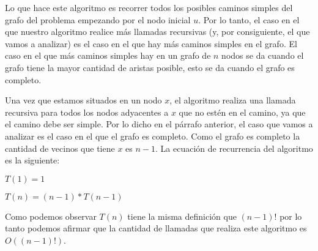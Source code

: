 Lo que hace este algoritmo es recorrer todos los posibles caminos simples del grafo del problema empezando por el nodo inicial $u$. Por lo tanto, el caso en el que nuestro algoritmo realice más llamadas recursivas (y, por consiguiente, el que vamos a analizar) es el caso en el que hay más caminos simples en el grafo. El caso en el que más caminos simples hay en un grafo de $n$ nodos se da cuando el grafo tiene la mayor cantidad de aristas posible, esto se da cuando el grafo es completo. 

Una vez que estamos situados en un nodo $x$, el algoritmo realiza una llamada recursiva para todos los nodos adyacentes a $x$ que no estén en el camino, ya que el camino debe ser simple. Por lo dicho en el párrafo anterior, el caso que vamos a analizar es el caso en el que el grafo es completo. Como el grafo es completo la cantidad de vecinos que tiene $x$ es $n-1$. La ecuación de recurrencia del algoritmo es la siguiente:

\begin{center}
 $T(1) = 1$ 
 
 $T(n) = (n-1)*T(n-1)$
\end{center}

Como podemos observar $T(n)$ tiene la misma definición que $(n-1)!$ por lo tanto podemos afirmar que la cantidad de llamadas que realiza este algoritmo es $O((n-1)!)$.